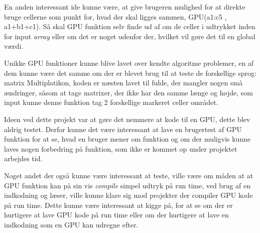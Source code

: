 En anden interessant ide kunne være, at give brugeren mulighed for at direkte bruge cellerne som punkt for, hvad der skal ligges sammen, GPU(a1:c5 , a1+b1+c1). Så skal GPU funktion selv finde ud af om de celler i udtrykket inden for input \textit{array} eller om det er noget udenfor der, hvilket vil gøre det til en global værdi. 

Unikke GPU funktioner kunne blive lavet over kendte algoritme problemer, en af dem kunne være det samme om der er blevet brug til at teste de forskellige sprog: matrix Multiplatikon, koden er næsten lavet til fulde, der mangler nogen små ændringer, såsom at tage matrixer, der ikke har den samme længe og højde, som input kunne denne funktion tag 2 forskellige markeret celler området.

Ideen ved dette projekt var at gøre det nemmere at kode til en GPU, dette blev aldrig testet. Derfor kunne det være interessant at lave en brugertest af GPU funktion for at se, hvad en bruger mener om funktion og om der muligvis kunne laves nogen forbedring på funktion, som ikke er kommet op under projektet arbejdes tid.

Noget andet der også kunne være interessant at teste, ville være om måden at at GPU funktion kan på sin vis \textit{compile} simpel udtryk på run time, ved brug af en indkodning og læser, ville kunne klare sig mod projekter der compiler GPU kode på run time. Dette kunne være interessant at kigge på, for at se om der er hurtigere at lave GPU kode på run time eller om der hurtigere at lave en indkodning som en GPU kan udregne efter.